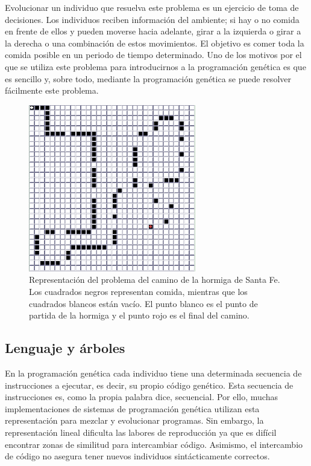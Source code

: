 Evolucionar un individuo que resuelva este problema es un ejercicio de toma de
decisiones. Los individuos reciben información del ambiente; si hay o no comida
en frente de ellos y pueden moverse hacia adelante, girar a la izquierda o
girar a la derecha o una combinación de estos movimientos. El objetivo es comer
toda la comida posible en un periodo de tiempo determinado. Uno de los
motivos por el que se utiliza este problema para introducirnos a la
programación genética es que es sencillo y, sobre todo, mediante la programación
genética se puede resolver fácilmente este problema.


\begin{figure}[t] \centering
\includegraphics[width=0.65\textwidth]{figs/sftrail}
\caption{Representación del problema del camino de la hormiga de Santa Fe. Los
cuadrados negros representan comida, mientras que los cuadrados blancos están
vacío. El punto blanco es el punto de partida de la hormiga y el punto rojo es
el final del camino.}
\label{fig:santa-fe}
\end{figure}


\subsection{Lenguaje y árboles}

En la programación genética cada individuo tiene una determinada secuencia de
instrucciones a ejecutar, es decir, su propio código genético. Esta secuencia de
instrucciones es, como la propia palabra dice, secuencial. Por ello, muchas
implementaciones de sistemas de programación genética utilizan esta
representación para mezclar y evolucionar programas. Sin embargo, la
representación lineal dificulta las labores de reproducción ya que es difícil
encontrar zonas de similitud para intercambiar código. Asimismo, el intercambio
de código no asegura tener nuevos individuos sintácticamente correctos.


